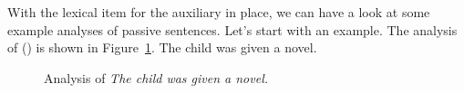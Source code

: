 
With the lexical item for the auxiliary in place, we can have a look at some example analyses of
passive sentences. Let's start with an  example. The analysis of () is shown in
Figure~\ref{fig-the-child-was-given-a-novel}.
\ea
The child was given a novel.
\z
\begin{figure}
\caption{\label{fig-the-child-was-given-a-novel}Analysis of \emph{The child was given a novel.}}
\end{figure}

